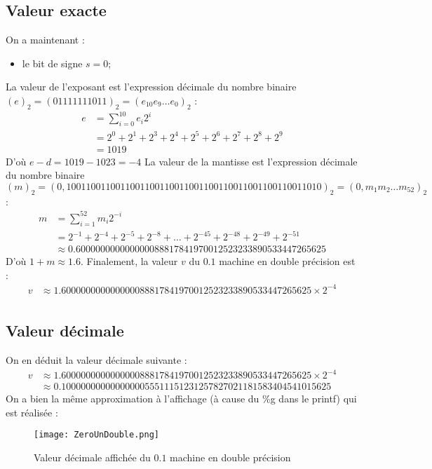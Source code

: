 \documentclass[a4paper, titlepage]{livret} %
\begin{document}
			\subsection{Valeur exacte}
				On a maintenant : 
				\begin{itemize}
					\item le bit de signe $s = 0$;
				\end{itemize}
				La valeur de l'exposant est l'expression décimale du nombre binaire $(e)_{2} = (01111111011)_{2} = (e_{10}e_{9}…e_{0})_{2}$ :
				\[\begin{aligned}
					e & = \sum_{i=0}^{10} e_{i}2^{i}\\
					  & = 2^{0} + 2^{1} + 2^{3} + 2^{4} + 2^{5} + 2^{6} + 2^{7} + 2^{8} + 2^{9}\\
					  & = 1019
				\end{aligned}\]
				D'où $e - d = 1019 - 1023 = -4$
				La valeur de la mantisse est l'expression décimale du nombre binaire $(m)_{2} = (0, 10011001 10011001 10011001 10011001 10011001 10011001 1010)_{2} = (0,m_{1}m_{2}…m_{52})_{2}$ :
				\[\begin{aligned}
					m & = \sum_{i=1}^{52} m_{i}2^{-i}\\
					  & = 2^{-1} + 2^{-4} + 2^{-5} + 2^{-8} + … + 2^{-45} + 2^{-48} + 2^{-49} + 2^{-51}\\
					  & \approx 0.600000000000000088817841970012523233890533447265625
				\end{aligned}\]
				D'où $1 + m \approx 1.6$.
				Finalement, la valeur $v$ du $0.1$ machine en double précision est :
				\[\begin{aligned}
					v & \approx 1.600000000000000088817841970012523233890533447265625\times 2^{-4}\\
				\end{aligned}\]
				\newpage

			\subsection{Valeur décimale}
				On en déduit la valeur décimale suivante :
				\[\begin{aligned}
					v & \approx 1.600000000000000088817841970012523233890533447265625 \times 2^{-4}\\
					  & \approx 0.1000000000000000055511151231257827021181583404541015625
				\end{aligned}\]
				On a bien la même approximation à l'affichage (à cause du \%g dans le printf) qui est réalisée :
				\begin{figure}[!h]
					\centering
  						\texttt{[image: ZeroUnDouble.png]}
  						\caption{Valeur décimale affichée du $0.1$ machine en double précision}
				\end{figure}
\end{document}
